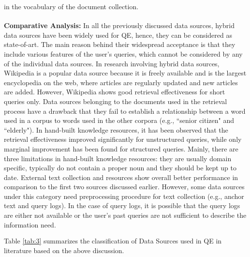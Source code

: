 in the vocabulary of the document collection. 
\\\\
\textbf{Comparative Analysis:}
In all the previously discussed data sources, hybrid data sources have been widely used for QE, hence, they can be considered as state-of-art. The main reason behind their widespread acceptance is that they include various features of the user's queries, which cannot be considered by any of the individual data sources. In research involving hybrid data sources, Wikipedia is a popular data source because it is freely available and is the largest encyclopedia on the web, where articles are regularly updated and new articles are added. However, Wikipedia shows  good retrieval effectiveness for short queries only. Data sources belonging to the documents used in the retrieval process have a drawback  that they fail to establish a relationship between a word used in a corpus to words used in the other corpora (e.g.,  ``senior citizen" and ``elderly"). In hand-built knowledge resources, it has been observed that the retrieval effectiveness improved significantly for unstructured queries, while only marginal improvement has been found for structured queries. Mainly, there are three limitations in hand-built knowledge resources: they are usually domain specific, typically do not contain a proper noun and they should be kept up to date. External text collection and resources show overall better performance in comparison to the first two sources discussed earlier. However, some data sources under this category need preprocessing procedure for text collection (e.g., anchor text and query logs). In the case of query logs, it is possible that the query logs are either not available or the user's past queries are not sufficient to describe the information need.

Table \ref{tab:3} summarizes the classification of Data Sources used in QE in literature based on the above discussion.

